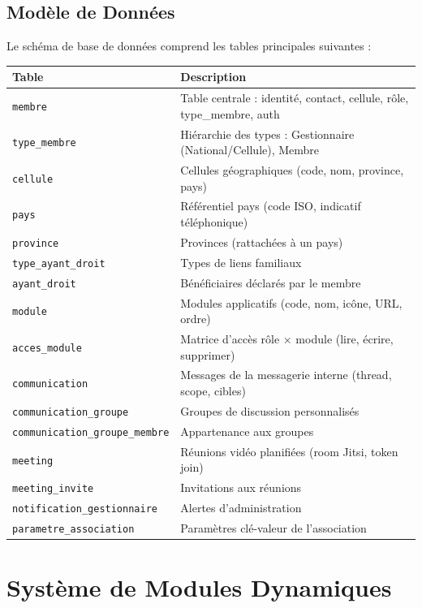 \documentclass[12pt,a4paper]{article}
\begin{document}
\subsection{Modèle de Données}

Le schéma de base de données comprend les tables principales suivantes :

\begin{longtable}{p{4cm}p{9cm}}
\toprule
\textbf{Table} & \textbf{Description} \\
\midrule
\endhead
\texttt{membre} & Table centrale : identité, contact, cellule, rôle, type\_membre, auth \\
\texttt{type\_membre} & Hiérarchie des types : Gestionnaire (National/Cellule), Membre \\
\texttt{cellule} & Cellules géographiques (code, nom, province, pays) \\
\texttt{pays} & Référentiel pays (code ISO, indicatif téléphonique) \\
\texttt{province} & Provinces (rattachées à un pays) \\
\texttt{type\_ayant\_droit} & Types de liens familiaux \\
\texttt{ayant\_droit} & Bénéficiaires déclarés par le membre \\
\texttt{module} & Modules applicatifs (code, nom, icône, URL, ordre) \\
\texttt{acces\_module} & Matrice d'accès rôle × module (lire, écrire, supprimer) \\
\texttt{communication} & Messages de la messagerie interne (thread, scope, cibles) \\
\texttt{communication\_groupe} & Groupes de discussion personnalisés \\
\texttt{communication\_groupe\_membre} & Appartenance aux groupes \\
\texttt{meeting} & Réunions vidéo planifiées (room Jitsi, token join) \\
\texttt{meeting\_invite} & Invitations aux réunions \\
\texttt{notification\_gestionnaire} & Alertes d'administration \\
\texttt{parametre\_association} & Paramètres clé-valeur de l'association \\
\bottomrule
\end{longtable}

\section{Système de Modules Dynamiques}
\end{document}
